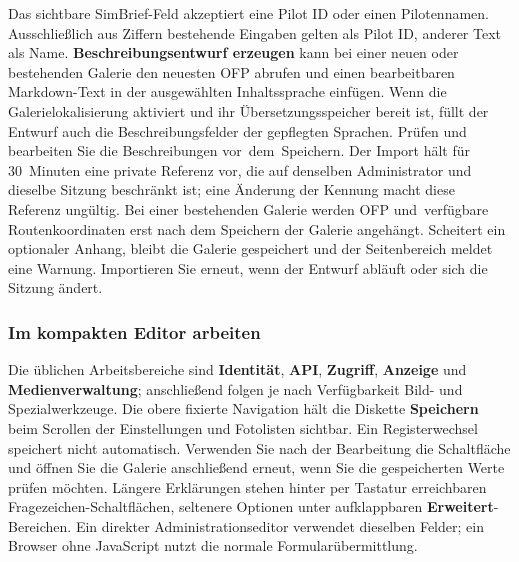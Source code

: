 \documentclass[11pt,a4paper]{article}
\newcommand{\ui}[1]{\textbf{#1}}
\begin{document}
Das sichtbare SimBrief-Feld akzeptiert eine Pilot ID oder einen Pilotennamen.
Ausschließlich aus Ziffern bestehende Eingaben gelten als Pilot ID, anderer Text
als Name. \ui{Beschreibungsentwurf erzeugen} kann bei einer neuen oder
bestehenden Galerie den neuesten OFP abrufen und einen bearbeitbaren
Markdown-Text in der ausgewählten Inhaltssprache einfügen. Wenn die
Galerielokalisierung aktiviert und ihr Übersetzungsspeicher bereit ist, füllt
der Entwurf auch die Beschreibungsfelder der gepflegten Sprachen. Prüfen und
bearbeiten Sie die Beschreibungen vor~dem~Speichern. Der Import hält für
30~Minuten eine private Referenz vor, die auf denselben Administrator und
dieselbe Sitzung beschränkt ist; eine Änderung der Kennung macht diese Referenz
ungültig. Bei einer bestehenden Galerie werden OFP und~verfügbare
Routenkoordinaten erst nach dem Speichern der Galerie angehängt. Scheitert ein
optionaler Anhang, bleibt die Galerie gespeichert und der Seitenbereich meldet
eine Warnung. Importieren Sie erneut, wenn der Entwurf abläuft oder sich die
Sitzung ändert.

\subsubsection{Im kompakten Editor arbeiten}

Die üblichen Arbeitsbereiche sind \ui{Identität}, \ui{API}, \ui{Zugriff},
\ui{Anzeige} und \ui{Medienverwaltung}; anschließend folgen je nach
Verfügbarkeit Bild- und Spezialwerkzeuge. Die obere fixierte Navigation hält die
Diskette \ui{Speichern} beim Scrollen der Einstellungen und Fotolisten sichtbar.
Ein Registerwechsel speichert nicht automatisch. Verwenden Sie nach der
Bearbeitung die Schaltfläche und öffnen Sie die Galerie anschließend erneut,
wenn Sie die gespeicherten Werte prüfen möchten. Längere Erklärungen stehen
hinter per Tastatur erreichbaren Fragezeichen-Schaltflächen, seltenere Optionen
unter aufklappbaren \ui{Erweitert}-Bereichen. Ein direkter Administrationseditor
verwendet dieselben Felder; ein Browser ohne JavaScript nutzt die normale
Formularübermittlung.
\end{document}
